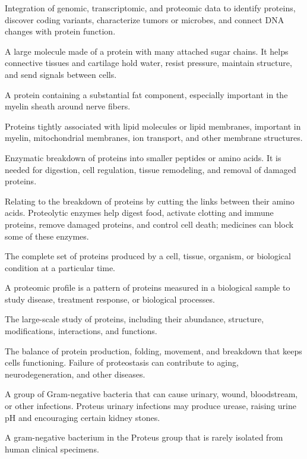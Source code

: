  Integration of genomic, transcriptomic, and proteomic data to identify proteins, discover coding variants, characterize tumors or microbes, and connect DNA changes with protein function.

 A large molecule made of a protein with many attached sugar chains. It helps connective tissues and cartilage hold water, resist pressure, maintain structure, and send signals between cells.

 A protein containing a substantial fat component, especially important in the myelin sheath around nerve fibers.

 Proteins tightly associated with lipid molecules or lipid membranes, important in myelin, mitochondrial membranes, ion transport, and other membrane structures.

 Enzymatic breakdown of proteins into smaller peptides or amino acids. It is needed for digestion, cell regulation, tissue remodeling, and removal of damaged proteins.

 Relating to the breakdown of proteins by cutting the links between their amino acids. Proteolytic enzymes help digest food, activate clotting and immune proteins, remove damaged proteins, and control cell death; medicines can block some of these enzymes.

 The complete set of proteins produced by a cell, tissue, organism, or biological condition at a particular time.

 A proteomic profile is a pattern of proteins measured in a biological sample to study disease, treatment response, or biological processes.

 The large-scale study of proteins, including their abundance, structure, modifications, interactions, and functions.

 The balance of protein production, folding, movement, and breakdown that keeps cells functioning. Failure of proteostasis can contribute to aging, neurodegeneration, and other diseases.

 A group of Gram-negative bacteria that can cause urinary, wound, bloodstream, or other infections. Proteus urinary infections may produce urease, raising urine pH and encouraging certain kidney stones.

 A gram-negative bacterium in the Proteus group that is rarely isolated from human clinical specimens.

